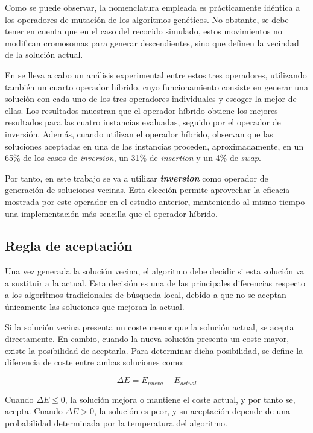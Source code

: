 Como se puede observar, la nomenclatura empleada es prácticamente idéntica a los operadores de mutación de los algoritmos 
genéticos. No obstante, se debe tener en cuenta que en el caso del recocido simulado, estos movimientos no modifican
cromosomas para generar descendientes, sino que definen la vecindad de la solución actual.

En \cite{zhan2016} se lleva a cabo un análisis experimental entre estos tres operadores, utilizando también un cuarto operador 
híbrido, cuyo funcionamiento consiste en generar una solución con cada uno de los tres operadores individuales y escoger 
la mejor de ellas. Los resultados muestran que el operador híbrido obtiene los mejores resultados para las cuatro
instancias evaluadas, seguido por el operador de inversión. Además, cuando utilizan el operador híbrido, observan que las 
soluciones aceptadas en una de las instancias proceden, aproximadamente, en un 65\% de los casos de \textit{inversion}, un
31\% de \textit{insertion} y un 4\% de \textit{swap}.

Por tanto, en este trabajo se va a utilizar \textbf{\textit{inversion}} como operador de generación de soluciones vecinas.
Esta elección permite aprovechar la eficacia mostrada por este operador en el estudio anterior, manteniendo al 
mismo tiempo una implementación más sencilla que el operador híbrido.

\subsection{Regla de aceptación}
\label{subsec:acceptance_rule}

Una vez generada la solución vecina, el algoritmo debe decidir si esta solución va a sustituir a la actual. Esta decisión
es una de las principales diferencias respecto a los algoritmos tradicionales de búsqueda local, debido a que no se aceptan 
únicamente las soluciones que mejoran la actual.

Si la solución vecina presenta un coste menor que la solución actual, se acepta directamente. En cambio, cuando la nueva 
solución presenta un coste mayor, existe la posibilidad de aceptarla. Para determinar dicha posibilidad, se define la 
diferencia de coste entre ambas soluciones como:

\begin{equation}
  \Delta E = E_{nueva} - E_{actual}  
\end{equation}

Cuando $\Delta E \leq 0$, la solución mejora o mantiene el coste actual, y por tanto se, acepta. Cuando $\Delta E > 0$,
la solución es peor, y su aceptación depende de una probabilidad determinada por la temperatura del algoritmo.

